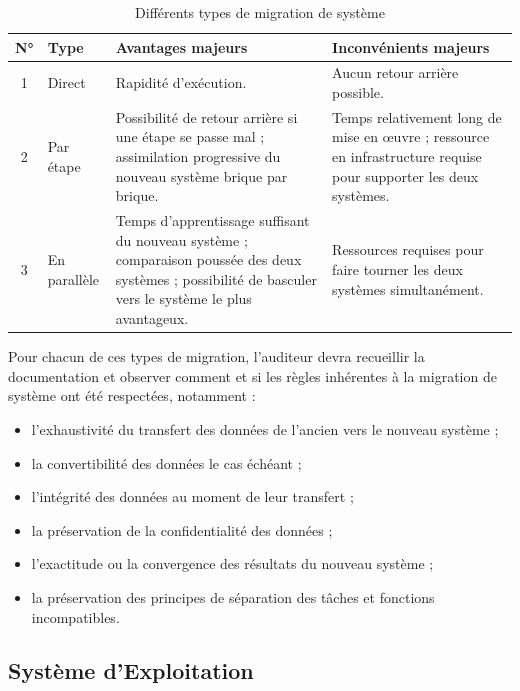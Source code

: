 \begin{table}[htbp]
\centering
\caption{Différents types de migration de système}
\label{tab:migration}
\small
\begin{tabular}{clp{5cm}p{5cm}}
\toprule
\textbf{N°} & \textbf{Type} & \textbf{Avantages majeurs} & \textbf{Inconvénients majeurs} \\
\midrule
1 & Direct & Rapidité d'exécution. & Aucun retour arrière possible. \\
2 & Par étape &
  Possibilité de retour arrière si une étape se passe mal ; assimilation progressive
  du nouveau système brique par brique. &
  Temps relativement long de mise en œuvre ; ressource en infrastructure requise pour
  supporter les deux systèmes. \\
3 & En parallèle &
  Temps d'apprentissage suffisant du nouveau système ; comparaison poussée des
  deux systèmes ; possibilité de basculer vers le système le plus avantageux. &
  Ressources requises pour faire tourner les deux systèmes simultanément. \\
\bottomrule
\end{tabular}
\end{table}

Pour chacun de ces types de migration, l'auditeur devra recueillir la documentation et
observer comment et si les règles inhérentes à la migration de système ont été
respectées, notamment :
\begin{itemize}
  \item l'exhaustivité du transfert des données de l'ancien vers le nouveau système ;
  \item la convertibilité des données le cas échéant ;
  \item l'intégrité des données au moment de leur transfert ;
  \item la préservation de la confidentialité des données ;
  \item l'exactitude ou la convergence des résultats du nouveau système ;
  \item la préservation des principes de séparation des tâches et fonctions
    incompatibles.
\end{itemize}

\subsection{Système d'Exploitation}

